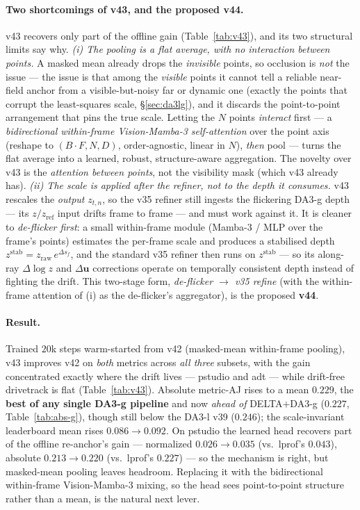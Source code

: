 \documentclass[11pt,a4paper]{article}
\begin{document}
\paragraph{Two shortcomings of v43, and the proposed v44.}
v43 recovers only part of the offline gain (Table~\ref{tab:v43}), and its two structural limits say why.
\emph{(i) The pooling is a flat average, with no interaction between points.} A masked mean already drops the
\emph{invisible} points, so occlusion is \emph{not} the issue --- the issue is that among the \emph{visible}
points it cannot tell a reliable near-field anchor from a visible-but-noisy far or dynamic one (exactly the
points that corrupt the least-squares scale, \S\ref{sec:da3lg}), and it discards the point-to-point
arrangement that pins the true scale. Letting the $N$ points \emph{interact} first --- a \emph{bidirectional
within-frame Vision-Mamba-3 self-attention} over the point axis (reshape to $(B\!\cdot\!F,N,D)$, order-agnostic,
linear in $N$), \emph{then} pool --- turns the flat average into a learned, robust, structure-aware
aggregation. The novelty over v43 is the \emph{attention between points}, not the visibility mask (which v43
already has).
\emph{(ii) The scale is applied \emph{after} the refiner, not to the depth it consumes.} v43 rescales the
\emph{output} $z_{t,n}$, so the v35 refiner still ingests the flickering DA3-g depth --- its
$z/z_{\text{ref}}$ input drifts frame to frame --- and must work against it. It is cleaner to
\emph{de-flicker first}: a small within-frame module (Mamba-3 / MLP over the frame's points) estimates the
per-frame scale and produces a stabilised depth $z^{\text{stab}}=z_{\text{raw}}\,e^{\Delta s_f}$, and the
standard v35 refiner then runs on $z^{\text{stab}}$ --- so its along-ray $\Delta\log z$ and $\Delta\mathbf{u}$
corrections operate on temporally consistent depth instead of fighting the drift. This two-stage form,
\emph{de-flicker $\to$ v35 refine} (with the within-frame attention of (i) as the de-flicker's aggregator),
is the proposed \textbf{v44}.

\paragraph{Result.}
Trained $20$k steps warm-started from v42 (masked-mean within-frame pooling), v43 improves v42 on
\emph{both} metrics across \emph{all three} subsets, with the gain concentrated exactly where the drift
lives --- pstudio and adt --- while drift-free drivetrack is flat (Table~\ref{tab:v43}). Absolute metric-AJ
rises to a mean $0.229$, the \textbf{best of any single DA3-g pipeline} and now \emph{ahead of}
DELTA$+$DA3-g ($0.227$, Table~\ref{tab:abs-g}), though still below the DA3-l v39 ($0.246$); the
scale-invariant leaderboard mean rises $0.086\!\to\!0.092$. On pstudio the learned head recovers part of the
offline re-anchor's gain --- normalized $0.026\!\to\!0.035$ (vs.\ lprof's $0.043$), absolute
$0.213\!\to\!0.220$ (vs.\ lprof's $0.227$) --- so the mechanism is right, but masked-mean pooling leaves
headroom. Replacing it with the bidirectional within-frame Vision-Mamba-3 mixing, so the head sees
point-to-point structure rather than a mean, is the natural next lever.
\end{document}
